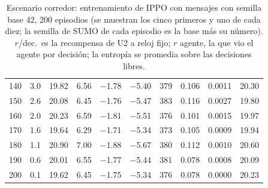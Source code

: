 \begin{table}[H]
\begin{tabular}{rrrrrrrrrr}
140 & 3.0 & 19.82 & 6.56 & $-$1.78 & $-$5.40 & 379 & 0.106 & 0.0011 & 20.30 \\
150 & 2.6 & 20.08 & 6.45 & $-$1.76 & $-$5.47 & 383 & 0.116 & 0.0027 & 19.80 \\
160 & 2.0 & 20.23 & 6.59 & $-$1.81 & $-$5.51 & 376 & 0.101 & 0.0015 & 19.97 \\
170 & 1.6 & 19.64 & 6.29 & $-$1.71 & $-$5.34 & 373 & 0.105 & 0.0009 & 19.94 \\
180 & 1.1 & 20.90 & 7.00 & $-$1.88 & $-$5.67 & 380 & 0.112 & 0.0010 & 20.60 \\
190 & 0.6 & 20.01 & 6.55 & $-$1.77 & $-$5.44 & 381 & 0.078 & 0.0008 & 20.09 \\
200 & 0.1 & 19.62 & 6.45 & $-$1.75 & $-$5.34 & 376 & 0.078 & 0.0000 & 20.23 \\
\bottomrule
\end{tabular}
\caption[Escenario corredor: entrenamiento de IPPO con mensajes, semilla base 42]{Escenario corredor: entrenamiento de IPPO con mensajes con semilla base 42, 200 episodios (se muestran los cinco primeros y uno de cada diez; la semilla de SUMO de cada episodio es la base más su número). $r$/dec.\ es la recompensa de U2 a reloj fijo; $r$ agente, la que vio el agente por decisión; la entropía se promedia sobre las decisiones libres.}
\label{tab:corredor-ippo-vecinos-42}
\end{table}

